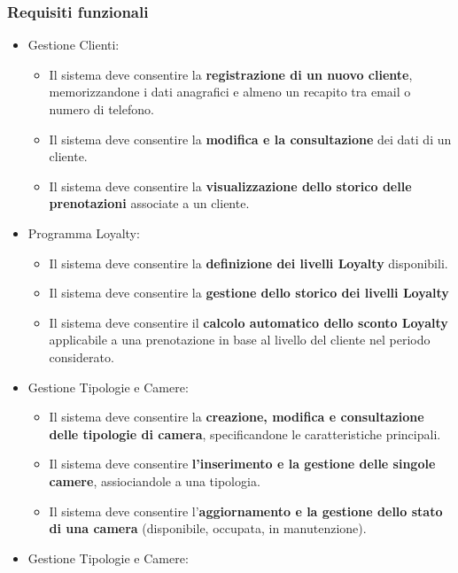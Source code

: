 \documentclass[a4paper,12pt]{report}
\begin{document}
\subsubsection{Requisiti funzionali}
\begin{itemize}
    \item Gestione Clienti:
          \begin{itemize}
              \item  Il sistema deve consentire la \textbf{registrazione di un nuovo cliente}, memorizzandone i dati anagrafici e almeno un recapito tra email o numero di telefono.
              \item Il sistema deve consentire la \textbf{modifica e la consultazione} dei dati di un cliente.
              \item Il sistema deve consentire la \textbf{visualizzazione dello storico delle prenotazioni} associate a un cliente.
          \end{itemize}
    \item Programma Loyalty:
          \begin{itemize}
              \item  Il sistema deve consentire la \textbf{definizione dei livelli Loyalty} disponibili.
              \item Il sistema deve consentire la \textbf{gestione dello storico dei livelli Loyalty}
              \item Il sistema deve consentire il \textbf{calcolo automatico dello sconto Loyalty} applicabile a una prenotazione in base al livello del cliente nel periodo considerato.
          \end{itemize}
    \item Gestione Tipologie e Camere:
          \begin{itemize}
              \item  Il sistema deve consentire la \textbf{creazione, modifica e consultazione delle tipologie di camera}, specificandone le caratteristiche principali.
              \item Il sistema deve consentire \textbf{l'inserimento e la gestione delle singole camere}, assiociandole a una tipologia.
              \item Il sistema deve consentire l'\textbf{aggiornamento e la gestione dello stato di una camera} (disponibile, occupata, in manutenzione).
          \end{itemize}
    \item Gestione Tipologie e Camere:
          \begin{itemize}

\end{itemize}
\end{itemize}
\end{document}
